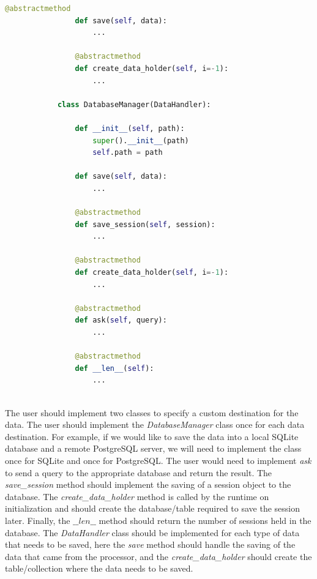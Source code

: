 \begin{itemize}
\begin{lstlisting}[language=Python]
                @abstractmethod
                def save(self, data):
                    ...

                @abstractmethod
                def create_data_holder(self, i=-1):
                    ...

            class DatabaseManager(DataHandler):

                def __init__(self, path):
                    super().__init__(path)
                    self.path = path
            
                def save(self, data):
                    ...
            
                @abstractmethod
                def save_session(self, session):
                    ...
            
                @abstractmethod
                def create_data_holder(self, i=-1):
                    ...
            
                @abstractmethod
                def ask(self, query):
                    ...
            
                @abstractmethod
                def __len__(self):
                    ...
            
        \end{lstlisting}
        The user should implement two classes to specify a custom destination for the data. The user should implement the \textit{DatabaseManager} 
        class once for each data destination. For example, if we would like to save the data into a local SQLite database and a remote PostgreSQL server, 
        we will need to implement the class once for SQLite and once for PostgreSQL. 
        The user would need to implement \textit{ask} to send a query to the appropriate database and return the result.
        The \textit{save\_session} method should implement the saving of a session object to the database.
        The \textit{create\_data\_holder} method is called by the runtime on initialization and should create the database/table required to save the session later.
        Finally, the $\_\_len\_\_$ method should return the number of sessions held in the database. 
        The \textit{DataHandler} class should be implemented for each type of data that needs to be saved, here the \textit{save} method should handle the 
        saving of the data that came from the processor, and the \textit{create\_data\_holder} should create the table/collection where the data needs to be saved.
    

\end{itemize}
